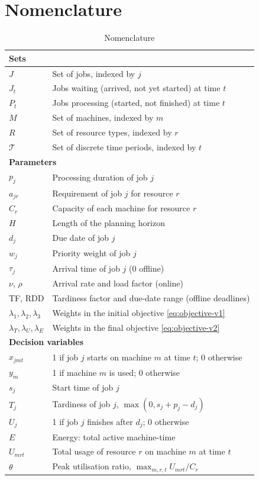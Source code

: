 \documentclass[12pt]{article}
\begin{document}
\newpage



\newpage
\appendix
\section{Nomenclature}\label{sec:AppendixA}
\begin{table}[htbp]
\centering
\caption{Nomenclature}
\label{tab:nomenclature}
\begin{tabular}{ll}
\toprule
\multicolumn{2}{l}{\textbf{Sets}}\\
\midrule
$J$ & Set of jobs, indexed by $j$ \\
$J_t$ & Jobs waiting (arrived, not yet started) at time $t$ \\
$P_t$ & Jobs processing (started, not finished) at time $t$ \\
$M$ & Set of machines, indexed by $m$ \\
$R$ & Set of resource types, indexed by $r$ \\
$\mathcal{T}$ & Set of discrete time periods, indexed by $t$ \\
\midrule
\multicolumn{2}{l}{\textbf{Parameters}}\\
\midrule
$p_j$ & Processing duration of job $j$ \\
$a_{jr}$ & Requirement of job $j$ for resource $r$ \\
$C_r$ & Capacity of each machine for resource $r$ \\
$H$ & Length of the planning horizon \\
$d_j$ & Due date of job $j$ \\
$w_j$ & Priority weight of job $j$ \\
$\tau_j$ & Arrival time of job $j$ ($0$ offline) \\
$\nu$, $\rho$ & Arrival rate and load factor (online) \\
TF, RDD & Tardiness factor and due-date range (offline deadlines) \\
$\lambda_1, \lambda_2, \lambda_3$ & Weights in the initial objective \cref{eq:objective-v1} \\
$\lambda_T, \lambda_U, \lambda_E$ & Weights in the final objective \cref{eq:objective-v2} \\
\midrule
\multicolumn{2}{l}{\textbf{Decision variables}}\\
\midrule
$x_{jmt}$ & 1 if job $j$ starts on machine $m$ at time $t$; 0 otherwise \\
$y_m$ & 1 if machine $m$ is used; 0 otherwise \\
$s_j$ & Start time of job $j$ \\
$T_j$ & Tardiness of job $j$, $\max(0, s_j + p_j - d_j)$ \\
$U_j$ & 1 if job $j$ finishes after $d_j$; 0 otherwise \\
$E$ & Energy: total active machine-time \\
$U_{mrt}$ & Total usage of resource $r$ on machine $m$ at time $t$ \\
$\theta$ & Peak utilisation ratio, $\max_{m,r,t} U_{mrt}/C_r$ \\
\bottomrule
\end{tabular}
\end{table}
\end{document}
